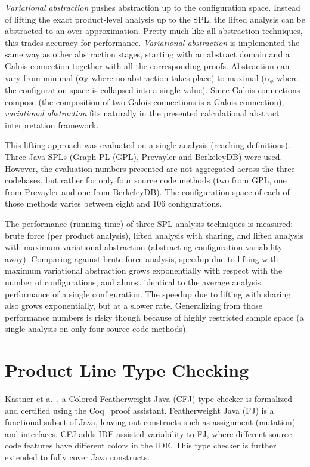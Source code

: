 \documentclass[11pt]{article}
\newcommand{\term}[1] {\emph{#1}}
\begin{document}
\term{Variational abstraction} pushes abstraction up to the configuration space. Instead of lifting the exact product-level analysis up to the SPL, the lifted analysis can be abstracted to an over-approximation. Pretty much like all abstraction techniques, this trades accuracy for performance. \term{Variational abstraction} is implemented the same way as other abstraction stages, starting with an abstract domain and a Galois connection together with all the corresponding proofs. Abstraction can vary from minimal ($\alpha_{\mathbb{F}}$ where no abstraction takes place) to maximal ($\alpha_\phi$ where the configuration space is collapsed into a single value). Since Galois connections compose (the composition of two Galois connections is a Galois connection), \term{variational abstraction} fits naturally in the presented calculational abstract interpretation framework.

This lifting approach was evaluated on a single analysis (reaching definitions). Three Java SPLs (Graph PL (GPL), Prevayler and BerkeleyDB) were used. However, the evaluation numbers presented are not aggregated across the three codebases, but rather for only four source code methods (two from GPL, one from Prevayler and one from BerkeleyDB). The configuration space of each of those methods varies between eight and 106 configurations.

The performance (running time) of three SPL analysis techniques is measured: brute force (per product analysis), lifted analysis with sharing, and lifted analysis with maximum variational abstraction (abstracting configuration variability away). Comparing against brute force analysis, speedup due to lifting with maximum variational abstraction grows exponentially with respect with the number of configurations, and almost identical to the average analysis performance of a single configuration. The speedup due to lifting with sharing also grows exponentially, but at a slower rate. Generalizing from those performance numbers is risky though because of highly restricted sample space (a single analysis on only four source code methods).

\section{Product Line Type Checking}

K\"{a}stner et a.~\cite{Kastner:2012}, a Colored Featherweight Java (CFJ) type checker is formalized and certified using the Coq~\cite{Bertot:2010} proof assistant. Featherweight Java (FJ) is a functional subset of Java, leaving out constructs such as assignment (mutation) and interfaces. CFJ adds IDE-assisted variability to FJ, where different source code features have different colors in the IDE. This type checker is further extended to fully cover Java constructs.
\end{document}

